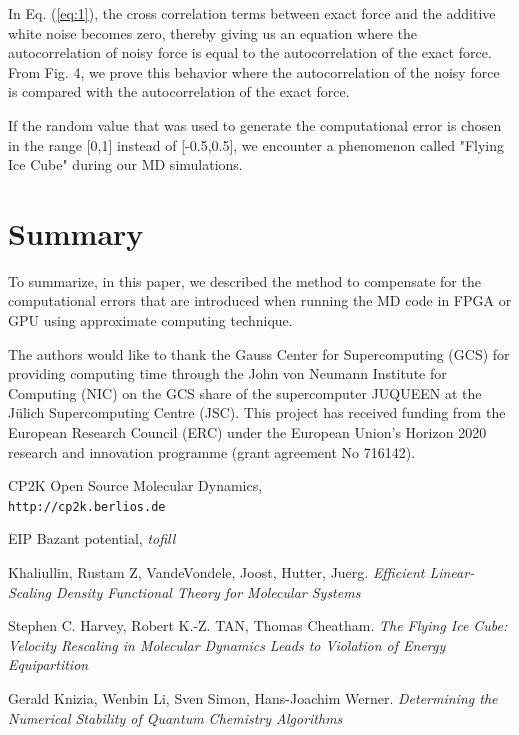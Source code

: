 \documentclass[aps,pre,twocolumn,showpacs,preprintnumbers,amsmath,amssymb]{revtex4-1}
\begin{document}
In Eq. (\ref{eq:1}), the cross correlation terms between exact force and the additive white noise becomes zero, thereby giving us an equation where the autocorrelation of noisy force is equal to the autocorrelation of the exact force. From Fig. 4, we prove this behavior where the autocorrelation of the noisy force is compared with the autocorrelation of the exact force. 

If the random value that was used to generate the computational error is chosen in the range [0,1] instead of [-0.5,0.5], we encounter a phenomenon called "Flying Ice Cube" \cite{flyingIceCube} during our MD simulations.  


\section{Summary}

To summarize, in this paper, we described the method to compensate for the computational errors that are introduced when running the MD code in FPGA or GPU using approximate computing technique.  


\begin{acknowledgments}
The authors would like to thank the Gauss Center for Supercomputing (GCS) for providing computing time through the John von Neumann Institute for Computing (NIC) on the GCS share of the supercomputer JUQUEEN at the J\"ulich Supercomputing Centre (JSC). This project has received funding from the European Research Council (ERC) under the European Union's Horizon 2020 research and innovation programme (grant agreement No 716142).
\end{acknowledgments}

%

\begin{thebibliography}{10}

CP2K Open Source Molecular Dynamics,
\\\texttt{http://cp2k.berlios.de}

EIP Bazant potential,
\textit{tofill}

Khaliullin, Rustam Z, VandeVondele, Joost, Hutter, Juerg. 
\textit{Efficient Linear-Scaling Density Functional Theory for Molecular Systems}

Stephen C. Harvey, Robert K.-Z. TAN, Thomas Cheatham. 
\textit{The Flying Ice Cube: Velocity Rescaling in Molecular Dynamics Leads to Violation of Energy Equipartition}

Gerald Knizia, Wenbin Li, Sven Simon, Hans-Joachim Werner. 
\textit{Determining the Numerical Stability of Quantum Chemistry Algorithms}


\end{thebibliography}

\end{document}
